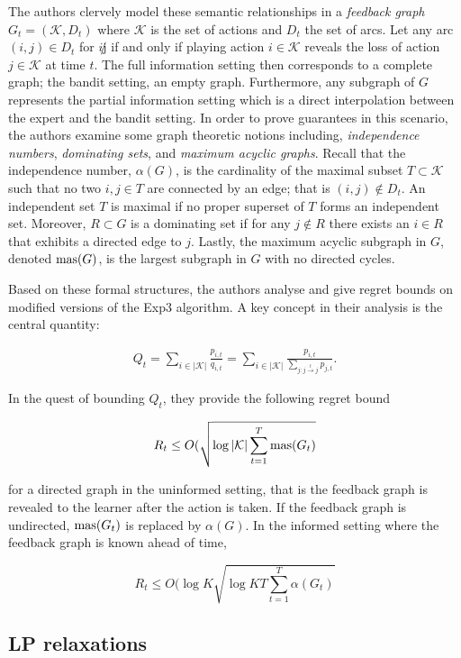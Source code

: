 The authors clervely model these semantic relationships in a \textit{feedback graph} $G_t=(\mathcal{K},D_t)$ where $\mathcal{K}$ is the set of actions and $D_t$ the set of arcs. Let any arc $(i,j)\in D_t$ for $i\not j$ if and only if playing action $i\in\mathcal{K}$ reveals the loss of action $j\in \mathcal{K}$ at time $t$. The full information setting then corresponds to a complete graph; the bandit setting, an empty graph. Furthermore, any subgraph of $G$ represents the partial information setting which is a direct interpolation between the expert and the bandit setting. In order to prove guarantees in this scenario, the authors examine some graph theoretic notions including, \textit{independence numbers}, \textit{dominating sets}, and \textit{maximum acyclic graphs}. Recall that the independence number, $\alpha(G)$, is the cardinality of the maximal subset $T\subset \mathcal{K}$ such that no two $i,j\in T$ are connected by an edge; that is $(i,j)\not\in D_t$. An independent set $T$ is maximal if no proper superset of $T$ forms an independent set. Moreover, $R\subset G$ is a dominating set if for any $j\not\in R$ there exists an $i\in R$ that exhibits a directed edge to $j$. Lastly, the maximum acyclic subgraph in $G$, denoted $\text{mas}(G)$, is the largest subgraph in $G$ with no directed cycles. 

Based on these formal structures, the authors analyse and give regret bounds on modified versions of the Exp3 algorithm. A key concept in their analysis is the central quantity:

\begin{align}
	Q_t=\sum_{i\in |\mathcal{K}|}\frac{p_{i,t}}{q_{i,t}} = \sum_{i\in |\mathcal{K}|}\frac{p_{i,t}}{\sum_{j:j\overset{t}{\to}j} p_{j,t}}.
\end{align}

In the quest of bounding $Q_t$, they provide the following regret bound

$$R_t\leq O(\sqrt{\log |\mathcal{K}|\sum_{t=1}^T\text{mas}(G_t)}$$

for a directed graph in the uninformed setting, that is the feedback graph is revealed to the learner after the action is taken. If the feedback graph is undirected, $\text{mas}(G_t)$ is replaced by $\alpha(G)$. In the informed setting where the feedback graph is known ahead of time, 

$$R_t \leq O(\log K\sqrt{\log KT\sum_{t=1}^T\alpha(G_t)}$$

\subsection{LP relaxations}

